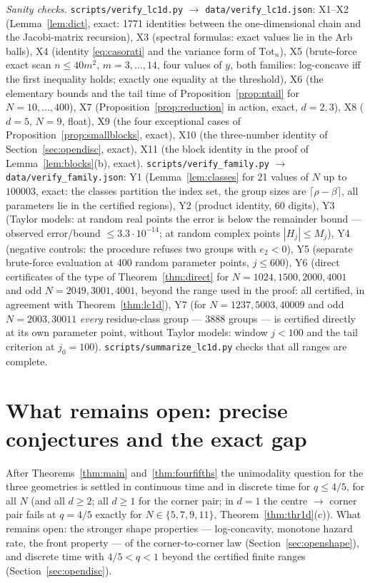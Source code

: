 \documentclass[11pt,a4paper]{article}
\theoremstyle{definition}
\begin{document}
\emph{Sanity checks.} \texttt{scripts/verify\_lc1d.py} $\to$ \texttt{data/verify\_lc1d.json}: X1--X2 (Lemma~\ref{lem:dict}, exact: 1771 identities between the one-dimensional chain and the Jacobi-matrix recursion), X3 (spectral formulas: exact values lie in the Arb balls), X4 (identity \eqref{eq:casorati} and the variance form of $\mathrm{Tot}_n$), X5 (brute-force exact scan $n\le40m^2$, $m=3,\dots,14$, four values of $y$, both families: log-concave iff the first inequality holds; exactly one equality at the threshold), X6 (the elementary bounds and the tail time of Proposition~\ref{prop:ntail} for $N=10,\dots,400$), X7 (Proposition~\ref{prop:reduction} in action, exact, $d=2,3$), X8 ($d=5$, $N=9$, float), X9 (the four exceptional cases of Proposition~\ref{prop:smallblocks}, exact), X10 (the three-number identity of Section~\ref{sec:opendisc}, exact), X11 (the block identity in the proof of Lemma~\ref{lem:blocks}(b), exact). \texttt{scripts/verify\_family.py} $\to$ \texttt{data/verify\_family.json}: Y1 (Lemma~\ref{lem:classes} for 21 values of $N$ up to $100003$, exact: the classes partition the index set, the group sizes are $\lceil\rho-\beta\rceil$, all parameters lie in the certified regions), Y2 (product identity, 60 digits), Y3 (Taylor models: at random real points the error is below the remainder bound --- observed error/bound $\le3.3\cdot10^{-14}$; at random complex points $|H_j|\le M_j$), Y4 (negative controls: the procedure refuses two groups with $e_2<0$), Y5 (separate brute-force evaluation at 400 random parameter points, $j\le600$), Y6 (direct certificates of the type of Theorem~\ref{thm:direct} for $N=1024,1500,2000,4001$ and odd $N=2049,3001,4001$, beyond the range used in the proof: all certified, in agreement with Theorem~\ref{thm:lc1d}), Y7 (for $N=1237,5003,40009$ and odd $N=2003,30011$ \emph{every} residue-class group --- 3888 groups --- is certified directly at its own parameter point, without Taylor models: window $j<100$ and the tail criterion at $j_0=100$). \texttt{scripts/summarize\_lc1d.py} checks that all ranges are complete.

\section{What remains open: precise conjectures and the exact gap}\label{sec:open}

After Theorems~\ref{thm:main} and~\ref{thm:fourfifths} the unimodality question for the three geometries is settled in continuous time and in discrete time for $q\le4/5$, for all $N$ (and all $d\ge2$; all $d\ge1$ for the corner pair; in $d=1$ the centre $\to$ corner pair fails at $q=4/5$ exactly for $N\in\{5,7,9,11\}$, Theorem~\ref{thm:thr1d}(c)). What remains open: the stronger shape properties --- log-concavity, monotone hazard rate, the front property --- of the corner-to-corner law (Section~\ref{sec:openshape}), and discrete time with $4/5<q<1$ beyond the certified finite ranges (Section~\ref{sec:opendisc}).
\end{document}
